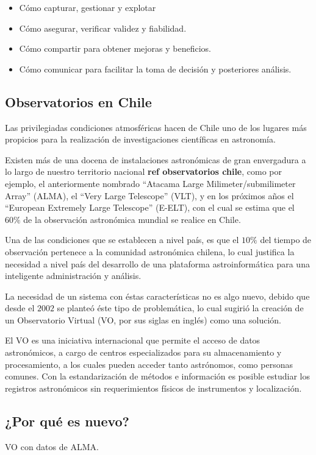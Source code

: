 \begin{itemize}
    \item Cómo capturar, gestionar y explotar
    \item Cómo asegurar, verificar validez y fiabilidad.
    \item Cómo compartir para obtener mejoras y beneficios.
    \item Cómo comunicar para facilitar la toma de decisión y posteriores análisis.
\end{itemize}

\subsection{Observatorios en Chile}

Las privilegiadas condiciones atmosféricas hacen de Chile uno de los lugares
más propicios para la realización de investigaciones científicas en astronomía.

Existen más de una docena de instalaciones astronómicas de gran envergadura a
lo largo de nuestro territorio nacional {\bf ref observatorios chile}, como por
ejemplo, el anteriormente nombrado ``Atacama Large Milimeter/submilimeter
Array'' (ALMA), el ``Very Large Telescope'' (VLT), y en los próximos años el
``European Extremely Large Telescope'' (E-ELT), con el cual se estima que el
$60\%$ de la observación astronómica mundial se realice en Chile.

Una de las condiciones que se establecen a nivel país, es que el $10\%$ del
tiempo de observación pertenece a la comunidad astronómica chilena, lo cual
justifica la necesidad a nivel país del desarrollo de una plataforma
astroinformática para una inteligente administración y análisis.

La necesidad de un sistema con éstas características no es algo nuevo, debido
que desde el $2002$ se planteó éste tipo de problemática, lo cual sugirió la
creación de un Observatorio Virtual (VO, por sus siglas en inglés) como una
solución.

El VO es una iniciativa internacional que permite el acceso de datos
astronómicos, a cargo de centros especializados para su almacenamiento y
procesamiento, a los cuales pueden acceder tanto astrónomos, como personas
comunes.  Con la estandarización de métodos e información es posible estudiar
los registros astronómicos sin requerimientos físicos de instrumentos y
localización.

\subsection{¿Por qué es nuevo?}
VO con datos de ALMA.

